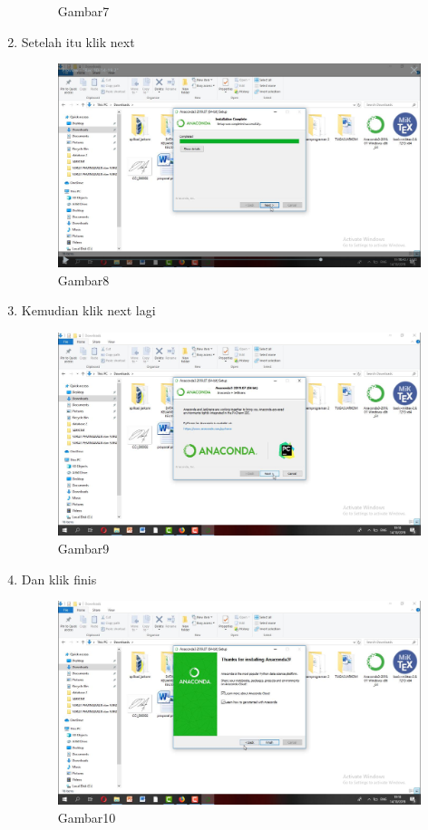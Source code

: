 \begin{enumerate}
\begin{figure}[h]
    \caption{Gambar7}
    \label{fig:my_label}
\end{figure}
\item Setelah itu klik next
\begin{figure}[h]
    \centering
    \includegraphics[scale=0.2]{gambar/cara8.png}
    \caption{Gambar8}
    \label{fig:my_label}
\end{figure}
\item Kemudian klik next lagi
\begin{figure}[h]
    \centering
    \includegraphics[scale=0.2]{gambar/cara9.png}
    \caption{Gambar9}
    \label{fig:my_label}
\end{figure}
\item Dan klik finis
\begin{figure}[h]
    \centering
    \includegraphics[scale=0.2]{gambar/cara11.png}
    \caption{Gambar10}
    \label{fig:my_label}
\end{figure}
\end{enumerate}